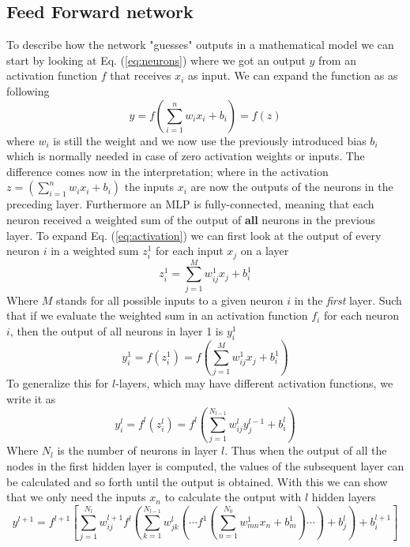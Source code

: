 \documentclass[14pt, a4paper]{book}
\begin{document}
\subsection{Feed Forward network}\label{sec:FFN}
To describe how the network "guesses" outputs in a mathematical model we can start by looking at Eq. (\ref{eq:neurons}) where we got an output $y$ from an activation function $f$ that receives $x_i$ as input. 
We can expand the function as as following
\begin{equation}\label{eq:activation}
    y=f\left(\sum_{i=1}^nw_ix_i+b_i\right)=f(z)
\end{equation} 
where $w_i$ is still the weight and we now use the previously introduced bias $b_i$ which is normally needed in case of zero activation weights or inputs. The difference comes now in the interpretation; where in the activation 
$z=(\sum_{i=1}^nw_ix_i+b_i)$ the inputs $x_i$ are now the outputs of the neurons in the preceding layer. Furthermore an MLP is fully-connected, meaning that each neuron received a weighted sum of the output of \textbf{all} 
neurons in the previous layer. To expand Eq. (\ref{eq:activation}) we can first look at the output of every neuron $i$ in a weighted sum $z^1_i$ for each input $x_j$ on a layer
\begin{equation}\label{eq:weightedsum}
    z_i^1=\sum_{j=1}^Mw_{ij}^1x_j + b^1_i
\end{equation}
Where $M$ stands for all possible inputs to a given neuron $i$ in the \textit{first} layer. Such that if we evaluate the weighted sum in an activation function $f_i$ for each neuron $i$, 
then the output of all neurons in layer 1 is $y_i^1$
$$
    y^1_i=f(z_i^1)=f\left(\sum_{j=1}^Mw_{ij}^1x_j + b^1_i\right)
$$
To generalize this for $l$-layers, which may have different activation functions, we write it as
$$
    y^l_i=f^l(z_i^l)=f^l\left(\sum_{j=1}^{N_{l-1}}w_{ij}^ly^{l-1}_j + b^l_i\right)
$$
Where $N_l$ is the number of neurons in layer $l$. Thus when the output of all the nodes in the first hidden layer is computed, the values of the subsequent layer can be calculated and so forth until the output is obtained. 
With this we can show that we only need the inputs $x_n$ to calculate the output with $l$ hidden layers
\begin{equation}\label{eq:MLP}
    y^{l+1}=f^{l+1}\left[\sum_{j=1}^{N_l}w^{l+1}_{ij}f^l\left(\sum_{k=1}^{N_{l-1}}w^{l}_{jk}\left(\cdots f^{1}\left(\sum_{n=1}^{N_0}w^1_{mn}x_n+b_m^1\right)\cdots\right)+b_j^{l}\right)+b^{l+1}_i   \right]
\end{equation}
\end{document}
